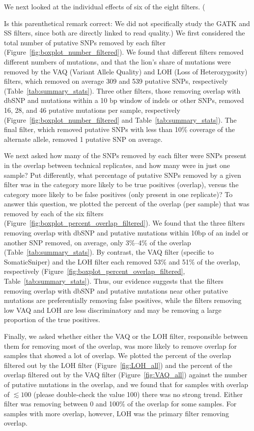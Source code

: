 \documentclass[11pt]{article} %
\begin{document}
We next looked at the individual effects of six of the eight filters. ({{\color{red}Is this parenthetical remark correct:} We did not specifically study the GATK and SS filters, since both are directly linked to read quality.) We first considered the total number of putative SNPs removed by each filter (Figure~\ref{fig:boxplot_number_filtered}). We found that different filters removed different numbers of mutations, and that the lion's share of mutations were removed by the VAQ (Variant Allele Quality) and LOH (Loss of Heterozygosity) filters, which removed on average 309 and 539 putative SNPs, respectively (Table~\ref{tab:summary_stats}). Three other filters, those removing overlap with dbSNP and mutations within a 10 bp window of indels or other SNPs, removed 16, 28, and 46 putative mutations per sample, respectively (Figure~\ref{fig:boxplot_number_filtered} and Table~\ref{tab:summary_stats}). The final filter, which removed putative SNPs with less than 10\% coverage of the alternate allele, removed 1 putative SNP on average. 

We next asked how many of the SNPs removed by each filter were SNPs present in the overlap between technical replicates, and how many were in just one sample? Put differently, what percentage of putative SNPs removed by a given filter was in the category more likely to be true positives (overlap), versus the category more likely to be false positives (only present in one replicate)? To answer this question, we plotted the percent of the overlap (per sample) that was removed by each of the six filters (Figure~\ref{fig:boxplot_percent_overlap_filtered}). We found that the three filters removing overlap with dbSNP and putative mutations within 10bp of an indel or another SNP removed, on average, only 3\%--4\% of the overlap (Table~\ref{tab:summary_stats}). By contrast, the VAQ filter (specific to SomaticSniper) and the LOH filter each removed 53\% and 51\% of the overlap, respectively (Figure~\ref{fig:boxplot_percent_overlap_filtered}, Table~\ref{tab:summary_stats}). Thus, our evidence suggests that the filters removing overlap with dbSNP and putative mutations near other putative mutations are preferentially removing false positives, while the filters removing low VAQ and LOH are less discriminatory and may be removing a large proportion of the true positives. 

Finally, we asked whether either the VAQ or the LOH filter, responsible between them for removing most of the overlap, was more likely to remove overlap for samples that showed a lot of overlap. We plotted the percent of the overlap filtered out by the LOH filter (Figure~\ref{fig:LOH_all}) and the percent of the overlap filtered out by the VAQ filter (Figure~\ref{fig:VAQ_all}) against the number of putative mutations in the overlap, and we found that for samples with overlap of $\lesssim 100$ {\color{red}(please double-check the value 100)} there was no strong trend. Either filter was removing between 0 and 100\% of the overlap for some samples. For samples with more overlap, however, LOH was the primary filter removing overlap.   

}
\end{document}
